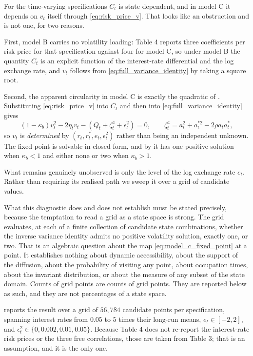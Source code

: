 \documentclass[11pt]{article}
\theoremstyle{definition}
\begin{document}
For the time-varying specifications $C_t$ is state dependent, and in model C it depends on $v_t$ itself through \eqref{eq:risk_price_v}. That looks like an obstruction and is not one, for two reasons.

First, model B carries no volatility loading: Table 4 reports three coefficients per risk price for that specification against four for model C, so under model B the quantity $C_t$ is an explicit function of the interest-rate differential and the log exchange rate, and $v_t$ follows from \eqref{eq:full_variance_identity} by taking a square root.

Second, the apparent circularity in model C is exactly the quadratic of . Substituting \eqref{eq:risk_price_v} into $C_t$ and then into \eqref{eq:full_variance_identity} gives
\begin{equation}\label{eq:model_c_fixed_point}
(1-\kappa_b)v_t^2-2\eta_tv_t-\left(Q_t+\zeta^a_t+\epsilon_t^2\right)=0,
\qquad
\zeta^a_t=a_t^2+a_t^{*2}-2\rho a_ta_t^*,
\end{equation}
so $v_t$ is \emph{determined} by $(r_t,r_t^*,e_t,\epsilon_t^2)$ rather than being an independent unknown. The fixed point is solvable in closed form, and by  it has one positive solution when $\kappa_b<1$ and either none or two when $\kappa_b>1$.

What remains genuinely unobserved is only the level of the log exchange rate $e_t$. Rather than requiring its realised path we sweep it over a grid of candidate values.

What this diagnostic does and does not establish must be stated precisely, because the temptation to read a grid as a state space is strong. The grid evaluates, at each of a finite collection of candidate state combinations, whether the inverse variance identity admits no positive volatility solution, exactly one, or two. That is an algebraic question about the map \eqref{eq:model_c_fixed_point} at a point. It establishes nothing about dynamic accessibility, about the support of the diffusion, about the probability of visiting any point, about occupation times, about the invariant distribution, or about the measure of any subset of the state domain. Counts of grid points are counts of grid points. They are reported below as such, and they are not percentages of a state space.

 reports the result over a grid of $56{,}784$ candidate points per specification, spanning interest rates from $0.05$ to $5$ times their long-run means, $e_t\in[-2,2]$, and $\epsilon_t^2\in\{0,0.002,0.01,0.05\}$. Because Table 4 does not re-report the interest-rate risk prices or the three free correlations, those are taken from Table 3; that is an assumption, and it is the only one.
\end{document}
